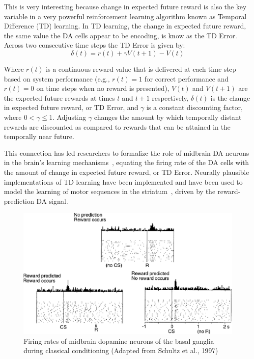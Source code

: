 This is very interesting because change in expected future reward is also the key variable in a very powerful reinforcement learning algorithm known as Temporal Difference (TD) learning.  In TD learning, the change in expected future reward, the same value the DA cells appear to be encoding, is know as the TD Error.  Across two consecutive time steps the TD Error is given by: 
\begin{equation}\delta(t) = r(t) + \gamma V(t+1) - V(t)\end{equation}

Where $r(t)$ is a continuous reward value that is delivered at each time step based on system performance (e.g., $r(t) = 1$ for correct performance and $r(t)=0$ on time steps when no reward is presented), $V(t)$ and $V(t+1)$ are the expected future rewards at times $t$ and $t+1$ respectively, \begin{math}\delta(t)\end{math} is the change in expected future reward, or TD Error, and \begin{math}\gamma\end{math} is a constant discounting factor, where \begin{math}0 < \gamma \leq 1\end{math}.  Adjusting \begin{math}\gamma\end{math} changes the amount by which temporally distant rewards are discounted as compared to rewards that can be attained in the temporally near future. 

This connection has led researchers to formalize the role of midbrain DA neurons in the brain's learning mechanisms~\cite{BartoAG:1994:TDLearning,MontaguePR:1996:Dopamine}, equating the firing rate of the DA cells with the amount of change in expected future reward, or TD Error.  Neurally plausible implementations of TD learning have been implemented and have been used to model the learning of motor sequences in the striatum~\cite{MontaguePR:1996:Dopamine}, driven by the reward-prediction DA signal.


\begin{figure}
 \includegraphics[width=15cm]{figures/schultz}
 \caption{Firing rates of midbrain dopamine neurons of the basal ganglia during classical conditioning (Adapted from Schultz et al., 1997)}
 \label{schultz}
\end{figure}


